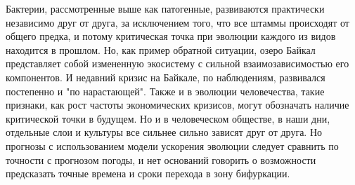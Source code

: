 

Бактерии, рассмотренные выше как патогенные, развиваются практически независимо друг от друга, за исключением того, что все штаммы происходят от общего предка, и потому критическая точка при эволюции каждого из видов находится в прошлом. Но, как пример обратной ситуации, озеро Байкал представляет собой измененную экосистему с сильной взаимозависимостью его компонентов. И недавний кризис на Байкале, по наблюдениям, развивался постепенно и "по нарастающей". Также и в эволюции человечества, такие признаки, как рост частоты экономических кризисов, могут обозначать наличие критической точки в будущем. Но и в человеческом обществе, в наши дни, отдельные слои и культуры все сильнее сильно зависят друг от друга. Но прогнозы с использованием модели ускорения эволюции следует сравнить по точности с прогнозом погоды, и нет оснований говорить о возможности предсказать точные времена и сроки перехода в зону бифуркации.



